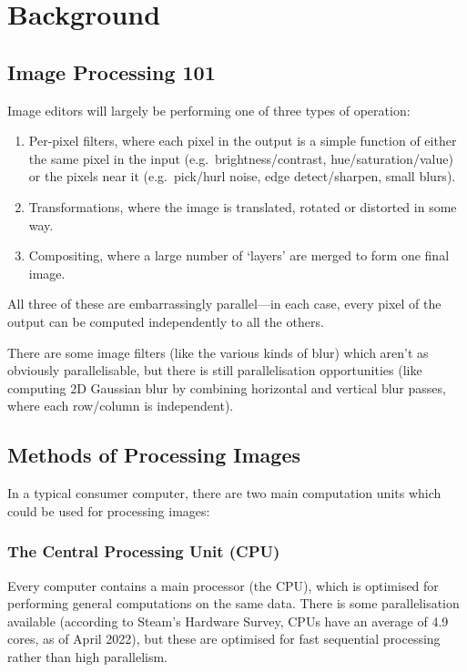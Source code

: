 \documentclass[12pt]{article}
\begin{document}
\section{Background}

\subsection{Image Processing 101}

Image editors will largely be performing one of three types of operation:

\begin{enumerate}
    \item Per-pixel filters, where each pixel in the output is a simple function of either the same
        pixel in the input (e.g.\ brightness/contrast, hue/saturation/value) or the pixels near it
        (e.g.\ pick/hurl noise, edge detect/sharpen, small blurs).
    \item Transformations, where the image is translated, rotated or distorted in some way.
    \item Compositing, where a large number of `layers' are merged to form one final image.
\end{enumerate}

All three of these are embarrassingly parallel---in each case, every pixel of the output can be
computed independently to all the others.

There are some image filters (like the various kinds of blur) which aren't as obviously
parallelisable, but there is still parallelisation opportunities (like computing 2D Gaussian blur by
combining horizontal and vertical blur passes, where each row/column is independent).



\subsection{Methods of Processing Images}

In a typical consumer computer, there are two main computation units which could be used for
processing images:

\subsubsection{The Central Processing Unit (CPU)}

Every computer contains a main processor (the CPU), which is optimised for performing general
computations on the same data.  There is some parallelisation available (according to Steam's
Hardware Survey, CPUs have an average of 4.9 cores, as of April 2022), but these are optimised for
fast sequential processing rather than high parallelism.
\end{document}
